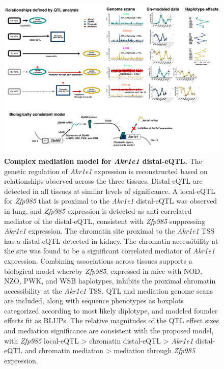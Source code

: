 \documentclass[9pt,twocolumn,twoside]{gsajnl}
\begin{document}
\begin{figure}[hp]
\renewcommand{\familydefault}{\sfdefault}\normalfont
\centering
\includegraphics[width=\textwidth, trim={0in 0.1in 0in 0in}, clip]{figs/akr1e1_full_model_update.pdf}
\caption{\textbf{Complex mediation model for \textit{Akr1e1} distal-eQTL.}  The genetic regulation of \textit{Akr1e1} expression is reconstructed based on relationships observed across the three tissues. Distal-eQTL are detected in all tissues at similar levels of significance. A local-eQTL for \textit{Zfp985} that is proximal to the \textit{Akr1e1} distal-eQTL was observed in lung, and \textit{Zfp985} expression is detected as anti-correlated mediator of the distal-eQTL, consistent with \textit{Zfp985} suppressing \textit{Akr1e1} expression. The chromatin site proximal to the \textit{Akr1e1} TSS has a distal-cQTL detected in kidney. The chromatin accessibility at the site was found to be a significant correlated mediator of \textit{Akr1e1} expression. Combining associations across tissues supports a biological model whereby \textit{Zfp985}, expressed in mice with NOD, NZO, PWK, and WSB haplotypes, inhibits the proximal chromatin accessibility at the \textit{Akr1e1} TSS. QTL and mediation genome scans are included, along with sequence phenotypes as boxplots categorized according to most likely diplotype, and modeled founder effects fit as BLUPs. The relative magnitudes of the QTL effect sizes and mediation significance are consistent with the proposed model, with \textit{Zfp985} local-eQTL > chromatin distal-eQTL > \textit{Akr1e1} distal-eQTL and chromatin mediation > mediation through \textit{Zfp985} expression.
\label{fig:akr1e1_full_model}}
\end{figure}
\end{document}
